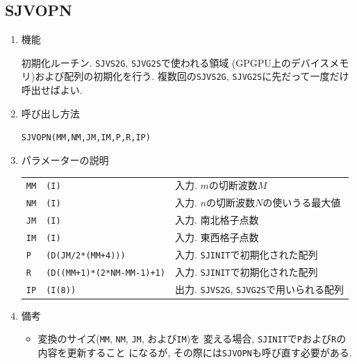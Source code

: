 \documentclass[a4j,fleqn]{jarticle}
\begin{document}

\subsection{SJVOPN}

\begin{enumerate}

\item 機能

初期化ルーチン. {\tt SJVS2G}, {\tt SJVG2S}で使われる領域
(GPGPU上のデバイスメモリ)および配列の初期化を行う.
複数回の{\tt SJVS2G}, {\tt SJVG2S}に先だって一度だけ呼出せばよい.

\item 呼び出し方法

{\tt SJVOPN(MM,NM,JM,IM,P,R,IP)}

\item パラメーターの説明

\begin{tabular}{lll}
{\tt MM} & {\tt (I)} & 入力. $m$の切断波数$M$\\
{\tt NM} & {\tt (I)} & 入力. $n$の切断波数$N$の使いうる最大値\\
{\tt JM} & {\tt (I)} & 入力. 南北格子点数\\
{\tt IM} & {\tt (I)} & 入力. 東西格子点数\\
{\tt P}  & {\tt (D(JM/2*(MM+4)))} 
      & 入力. {\tt SJINIT}で初期化された配列\\
{\tt R}  & {\tt (D((MM+1)*(2*NM-MM-1)+1)} 
      & 入力. {\tt SJINIT}で初期化された配列\\
{\tt IP}  & {\tt (I(8))}    & 出力. {\tt SJVS2G}, {\tt SJVG2S}で用いられる配列
\end{tabular}

\item 備考

\begin{itemize}

\item 変換のサイズ({\tt MM}, {\tt NM}, {\tt JM}, および{\tt IM})を
変える場合, {\tt SJINIT}で{\tt P}および{\tt R}の内容を更新すること
になるが, その際には{\tt SJVOPN}も呼び直す必要がある.

\end{itemize}

\end{enumerate}

\end{document}
